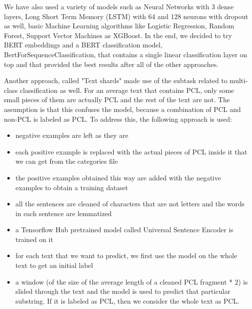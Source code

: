 \documentclass[11pt]{article}
\begin{document}
\begin{enumerate}
	      We have also used a variety of models such as Neural Networks with 3 dense layers, Long Short
	      Term Memory (LSTM) with 64 and 128 neurons with dropout as well, basic
	      Machine Learning algorithms like Logistic Regression, Random Forest, Support
	      Vector Machines as XGBoost. In the end, we decided to try BERT embeddings
	      and a BERT classification model, BertForSequenceClassification, that
	      contains a single linear classification layer on top and that provided the
	      best results after all of the other approaches.

	      Another approach, called "Text shards" made use of the subtask related to
	      multi-class classification as well. For an average text that contains PCL,
	      only some small pieces of them are actually PCL and the rest of the text are
	      not. The assumption is that this confuses the model, because a combination
	      of PCL and non-PCL is labeled as PCL. To address this, the following
	      approach is used:

	      \begin{itemize}
		      \item negative examples are left as they are

		      \item each positive example is replaced with the actual pieces of PCL inside
		            it that we can get from the categories file

		      \item the positive examples obtained this way are added with the negative
		            examples to obtain a training dataset

		      \item all the sentences are cleaned of characters that are not letters and
		            the words in each sentence are lemmatized

		      \item a Tensorflow Hub pretrained model called Universal Sentence Encoder is
		            trained on it

		      \item for each text that we want to predict, we first use the model on the
		            whole text to get an initial label

		      \item a window (of the size of the average length of a cleaned PCL fragment
		            * 2) is slided through the text and the model is used to predict that
		            particular substring. If it is labeled as PCL, then we consider the whole
		            text as PCL.
	      \end{itemize}


\end{enumerate}
\end{document}
